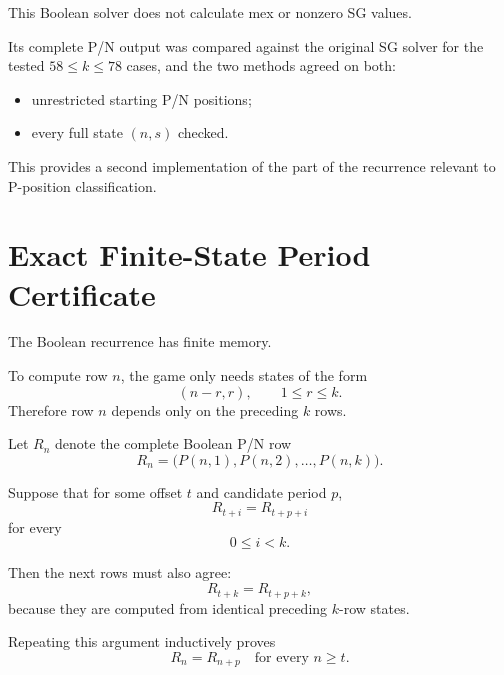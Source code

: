 \documentclass[11pt]{article}
\begin{document}
This Boolean solver does not calculate mex or nonzero SG values.

Its complete P/N output was compared against the original SG solver for the tested $58\le k\le78$ cases, and the two methods agreed on both:
\begin{itemize}
    \item unrestricted starting P/N positions;
    \item every full state $(n,s)$ checked.
\end{itemize}

This provides a second implementation of the part of the recurrence relevant to P-position classification.

\section{Exact Finite-State Period Certificate}

The Boolean recurrence has finite memory.

To compute row $n$, the game only needs states of the form
\begin{equation}
    (n-r,r),
    \qquad
    1\le r\le k.
\end{equation}
Therefore row $n$ depends only on the preceding $k$ rows.

Let $R_n$ denote the complete Boolean P/N row
\begin{equation}
    R_n=\bigl(P(n,1),P(n,2),\ldots,P(n,k)\bigr).
\end{equation}

Suppose that for some offset $t$ and candidate period $p$,
\begin{equation}
    R_{t+i}=R_{t+p+i}
\end{equation}
for every
\begin{equation}
    0\le i<k.
\end{equation}

Then the next rows must also agree:
\begin{equation}
    R_{t+k}=R_{t+p+k},
\end{equation}
because they are computed from identical preceding $k$-row states.

Repeating this argument inductively proves
\begin{equation}
\boxed{
    R_n=R_{n+p}\quad\text{for every }n\ge t.
}
\end{equation}
\end{document}
